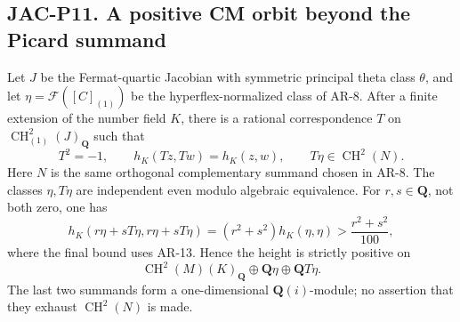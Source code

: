 
\subsection*{JAC-P11. A positive CM orbit beyond the Picard summand}

\begin{proposition}[JAC-P11]\label{jac:P11}
Let $J$ be the Fermat-quartic Jacobian with symmetric principal theta
class $\theta$, and let $\eta=\mathcal F([C]_{(1)})$ be the
hyperflex-normalized class of AR-8. After a finite extension of the
number field $K$, there is a rational correspondence $T$ on
$\operatorname{CH}^2_{(1)}(J)_{\mathbf Q}$ such that
\[
 T^2=-1,\qquad h_K(Tz,Tw)=h_K(z,w),\qquad
 T\eta\in\operatorname{CH}^2(N).                       \tag{JAC.P11.1}
\]
Here $N$ is the same orthogonal complementary summand chosen in AR-8.
The classes $\eta,T\eta$ are independent even modulo algebraic
equivalence. For $r,s\in\mathbf Q$, not both zero, one has
\[
 h_K(r\eta+sT\eta,r\eta+sT\eta)
   =(r^2+s^2)h_K(\eta,\eta)>\frac{r^2+s^2}{100},        \tag{JAC.P11.2}
\]
where the final bound uses AR-13. Hence the height is strictly
positive on
\[
 \operatorname{CH}^2(M)(K)_{\mathbf Q}
       \oplus\mathbf Q\eta\oplus\mathbf Q T\eta.        \tag{JAC.P11.3}
\]
The last two summands form a one-dimensional $\mathbf Q(i)$-module;
no assertion that they exhaust $\operatorname{CH}^2(N)$ is made.
\end{proposition}

